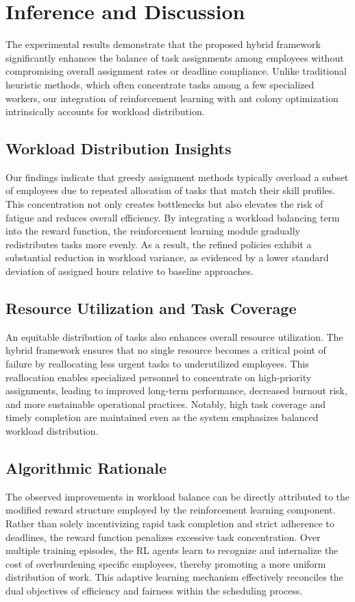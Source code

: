\documentclass[conference]{IEEEtran}
\begin{document}
	


\section{Inference and Discussion}
The experimental results demonstrate that the proposed hybrid framework significantly
enhances the balance of task assignments among employees without compromising overall
assignment rates or deadline compliance. Unlike traditional heuristic methods,
which often concentrate tasks among a few specialized workers, our integration
of reinforcement learning with ant colony optimization intrinsically accounts
for workload distribution.

\subsection{Workload Distribution Insights}
Our findings indicate that greedy assignment methods typically overload a
subset of employees due to repeated allocation of tasks that match their skill
profiles. This concentration not only creates bottlenecks but also elevates the
risk of fatigue and reduces overall efficiency. By integrating a workload
balancing term into the reward function, the reinforcement learning module gradually
redistributes tasks more evenly. As a result, the refined policies exhibit a substantial
reduction in workload variance, as evidenced by a lower standard deviation of
assigned hours relative to baseline approaches.

\subsection{Resource Utilization and Task Coverage}
An equitable distribution of tasks also enhances overall resource utilization.
The hybrid framework ensures that no single resource becomes a critical point of
failure by reallocating less urgent tasks to underutilized employees. This
reallocation enables specialized personnel to concentrate on high-priority
assignments, leading to improved long-term performance, decreased burnout risk,
and more sustainable operational practices. Notably, high task coverage and timely
completion are maintained even as the system emphasizes balanced workload distribution.

\subsection{Algorithmic Rationale}
The observed improvements in workload balance can be directly attributed to the
modified reward structure employed by the reinforcement learning component.
Rather than solely incentivizing rapid task completion and strict adherence to
deadlines, the reward function penalizes excessive task concentration. Over
multiple training episodes, the RL agents learn to recognize and internalize the
cost of overburdening specific employees, thereby promoting a more uniform
distribution of work. This adaptive learning mechanism effectively reconciles the
dual objectives of efficiency and fairness within the scheduling process.
\end{document}
